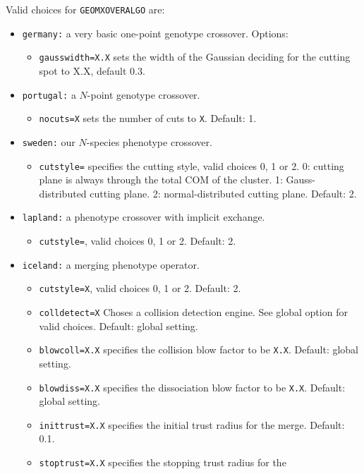 \documentclass[a4paper,10pt]{scrbook}
\begin{document}
Valid choices for \texttt{GEOMXOVERALGO} are:
\begin{itemize}
  \item \texttt{germany:} a very basic one-point genotype crossover. Options:
  \begin{itemize}
    \item \texttt{gausswidth=X.X} sets the width of the Gaussian deciding for 
the cutting spot to X.X, default 0.3.
  \end{itemize}
  \item \texttt{portugal:} a $N$-point genotype crossover.
  \begin{itemize}
    \item \texttt{nocuts=X} sets the number of cuts to \texttt{X}. Default: 1.
  \end{itemize}
  \item \texttt{sweden:} our $N$-species phenotype crossover.
  \begin{itemize}
    \item \texttt{cutstyle=} specifies the cutting style, valid choices 0, 1 or 
2. 0: cutting plane is always through the total COM of the cluster. 1: 
Gauss-distributed cutting plane. 2: normal-distributed cutting plane. Default: 
2.
  \end{itemize}
  \item \texttt{lapland:} a phenotype crossover with implicit exchange.
  \begin{itemize}
    \item \texttt{cutstyle=}, valid choices 0, 1 or 2. Default: 2.
  \end{itemize}
  \item \texttt{iceland:} a merging phenotype operator.
  \begin{itemize}
    \item \texttt{cutstyle=X}, valid choices 0, 1 or 2. Default: 2.
    \item \texttt{colldetect=X} Choses a collision detection engine. See global 
option for valid choices. Default: global setting.
    \item \texttt{blowcoll=X.X} specifies the collision blow factor to be 
\texttt{X.X}. Default: global setting.
    \item \texttt{blowdiss=X.X} specifies the dissociation blow factor to be 
\texttt{X.X}. Default: global setting.
    \item \texttt{inittrust=X.X} specifies the initial trust radius for the 
merge. Default: 0.1.
    \item \texttt{stoptrust=X.X} specifies the stopping trust radius for the 

\end{itemize}
\end{itemize}
\end{document}
